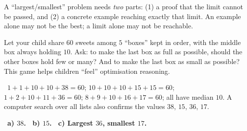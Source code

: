\documentclass[11pt]{article}
\providecommand{\AnsWord}{Đáp số}
\newcommand{\ans}[1]{\par\smallskip{\bfseries\color{tmGreen!88!black}\AnsWord:}\ {\bfseries\color{AnsRed}#1}\par}
\newcommand{\verify}[1]{\par\smallskip\noindent{\bfseries\color{tmGreen!80!black}\faCheckCircle\ \CheckWord}\ #1\par}
\def\AnsWord{Answer}
\def\CheckWord{Check:}
\begin{document}
{\begin{warnbox}A ``largest/smallest'' problem needs \emph{two} parts: (1) a proof that the limit cannot be passed, and (2) a concrete example reaching exactly that limit. An example alone may not be the best; a limit alone may not be reachable.\end{warnbox}

\begin{parentbox}Let your child share $60$ sweets among $5$ ``boxes'' kept in order, with the middle box always holding $10$. Ask: to make the last box as full as possible, should the other boxes hold few or many? And to make the last box as small as possible? This game helps children ``feel'' optimisation reasoning.\end{parentbox}

\verify{$1+1+10+10+38=60$; $10+10+10+15+15=60$; $1+2+10+11+36=60$; $8+9+10+16+17=60$; all have median $10$. A computer search over all lists also confirms the values $38$, $15$, $36$, $17$.}
\ans{a) $38$. \ b) $15$. \ c) Largest $36$, smallest $17$.}
}
\end{document}
